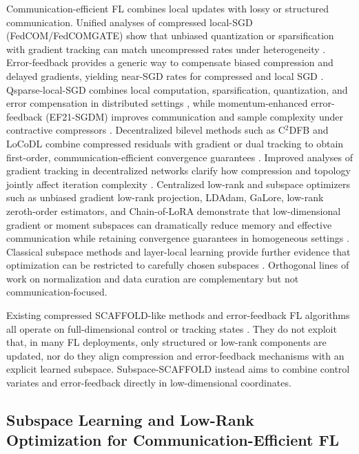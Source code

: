 \documentclass[11pt]{article}
\begin{document}
Communication-efficient FL combines local updates with lossy or structured communication. Unified analyses of compressed local-SGD (FedCOM/FedCOMGATE) show that unbiased quantization or sparsification with gradient tracking can match uncompressed rates under heterogeneity \citep{Haddadpour2020FederatedLW}. Error-feedback provides a generic way to compensate biased compression and delayed gradients, yielding near-SGD rates for compressed and local SGD \citep{stich2019error}. Qsparse-local-SGD combines local computation, sparsification, quantization, and error compensation in distributed settings \citep{basu2019qsparse}, while momentum-enhanced error-feedback (EF21-SGDM) improves communication and sample complexity under contractive compressors \citep{Fatkhullin2023MomentumPI}. Decentralized bilevel methods such as C\(^2\)DFB and LoCoDL combine compressed residuals with gradient or dual tracking to obtain first-order, communication-efficient convergence guarantees \citep{Wen2024ACA, Condat2024LoCoDLCD}. Improved analyses of gradient tracking in decentralized networks clarify how compression and topology jointly affect iteration complexity \citep{koloskova2021improved}. Centralized low-rank and subspace optimizers such as unbiased gradient low-rank projection, LDAdam, GaLore, low-rank zeroth-order estimators, and Chain-of-LoRA demonstrate that low-dimensional gradient or moment subspaces can dramatically reduce memory and effective communication while retaining convergence guarantees in homogeneous settings \citep{pan2025unbiased, Robert2024LDAdamAO, Zhao2024GaLoreML, chen2024enhancing, xia2024chain}. Classical subspace methods and layer-local learning provide further evidence that optimization can be restricted to carefully chosen subspaces \citep{Yang2015LearningW, Hinton2022TheFA}. Orthogonal lines of work on normalization and data curation \citep{wu2018group, Cobbe2021TrainingVT} are complementary but not communication-focused.

Existing compressed SCAFFOLD-like methods and error-feedback FL algorithms all operate on full-dimensional control or tracking states \citep{Huang2023StochasticCA, Haddadpour2020FederatedLW}. They do not exploit that, in many FL deployments, only structured or low-rank components are updated, nor do they align compression and error-feedback mechanisms with an explicit learned subspace. Subspace-SCAFFOLD instead aims to combine control variates and error-feedback directly in low-dimensional coordinates.

\subsection{Subspace Learning and Low-Rank Optimization for Communication-Efficient FL}
\end{document}
